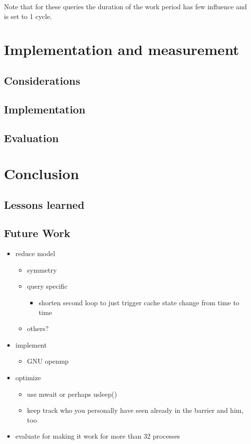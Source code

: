 \documentclass[a4paper, 10pt]{article}
\begin{document}
Note that for these queries the duration of the work period has few influence and is set to 1 cycle.

\section{Implementation and measurement}
\subsection{Considerations}
\subsection{Implementation}
\subsection{Evaluation}

\section{Conclusion}
\subsection{Lessons learned}
\subsection{Future Work}
\begin{itemize}
	\item reduce model
		\begin{itemize}
		\item symmetry
		\item query specific
			\begin{itemize}
				\item shorten second loop to just trigger cache state change from time to time
			\end{itemize}
		\item others?
		\end{itemize}
	\item implement
		\begin{itemize}
			\item GNU openmp
		\end{itemize}
	\item optimize
		\begin{itemize}
			\item use mwait or perhaps usleep()
			\item keep track who you personally have seen already in the barrier and him, too
		\end{itemize}
	\item evaluate for making it work for more than 32 processes
\end{itemize}


\nocite{*} %

{}
\end{document}
